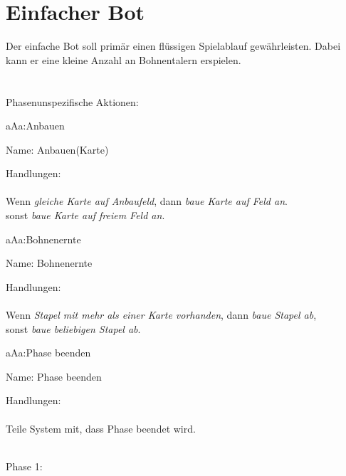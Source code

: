 \section{Einfacher Bot}

Der einfache Bot soll primär einen flüssigen Spielablauf gewährleisten. Dabei kann er eine kleine Anzahl an Bohnentalern erspielen.\\
\\ 

\hfill\\ Phasenunspezifische Aktionen:\\
\setcounter{a}{10}

\begin{description}[leftmargin=5em, style=sameline]
	
	\begin{lhp}{a}{A}{a:Anbauen }
		\item [Name:] Anbauen(Karte)
		\item [Handlungen:]\hfill\\ 
		\\Wenn {\itshape gleiche Karte auf Anbaufeld}, dann 
		{\itshape baue Karte auf Feld an}.\\
		sonst {\itshape baue Karte auf freiem Feld an}.
		
	\end{lhp}
	
	\begin{lhp}{a}{A}{a:Bohnenernte}
		\item [Name:] Bohnenernte
		\item [Handlungen:]\hfill\\ 
		\\Wenn {\itshape Stapel mit mehr als einer Karte vorhanden}, dann 
		{\itshape baue Stapel ab},\\
		sonst {\itshape baue beliebigen Stapel ab}.
		
	\end{lhp}

	\begin{lhp}{a}{A}{a:Phase beenden}
	\item [Name:] Phase beenden
	\item [Handlungen:]\hfill\\ 
	\\Teile System mit, dass Phase beendet wird.
	\end{lhp}

\end{description}


\hfill\\ Phase 1:\\
\setcounter{p1}{10}

